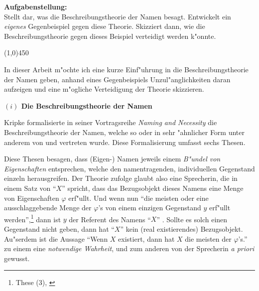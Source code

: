 \documentclass[a4paper, emulatestandardclasses, 12pt]{scrartcl}
\begin{document}
\begin{onehalfspace} 

\noindent\textbf{Aufgabenstellung:}\\
Stellt dar, was die Beschreibungstheorie der Namen besagt. Entwickelt ein \emph{eigenes} Gegenbeispiel gegen diese Theorie. Skizziert dann, wie die Beschreibungstheorie gegen dieses Beispiel verteidigt werden k"onnte.
\begin{center}
\vspace{-9pt}\line(1,0){450}
\end{center}

\vspace{0mm}
\noindent In dieser Arbeit m"ochte ich eine kurze Einf"uhrung in die Beschreibungstheorie der Namen geben, anhand eines Gegenbeispiels Unzul"anglichkeiten daran aufzeigen und eine m"ogliche Verteidigung der Theorie skizzieren.  

\vspace{3mm}

\noindent\textbf{$(i)$ Die Beschreibungstheorie der Namen}

\noindent Kripke formalisierte in seiner Vortragsreihe \emph{Naming and Necessity} \citep{kripke1972naming}  die Beschreibungstheorie der Namen, welche so oder in sehr "ahnlicher Form unter anderem von \citet{begriffundgegenstand} und \citet{russell1905denoting} vertreten wurde. Diese Formalisierung umfasst sechs Thesen.

Diese Thesen besagen, dass (Eigen-) Namen jeweils einem \emph{B"undel von Eigenschaften} entsprechen, welche den namentragenden, individuellen Gegenstand einzeln herausgreifen. Der Theorie zufolge glaubt also eine Sprecherin, die in einem Satz von "`$X$"' spricht, dass das Bezugsobjekt dieses Namens eine Menge von Eigenschaften $\varphi$ erf"ullt. Und wenn nun  "`die meisten oder eine ausschlaggebende Menge der $\varphi$'s von einem einzigen Gegenstand $y$ erf"ullt werden"',\footnote{These (3), \cite{kripke1972naming}} dann ist $y$ der Referent des Namens "`$X$"' . Sollte es solch einen Gegenstand nicht geben, dann hat "`$X$"' kein (real existierendes) Bezugsobjekt. Au"serdem ist die Aussage "`Wenn $X$ existiert, dann hat $X$ die meisten der $\varphi$'s."' zu einem eine \emph{notwendige Wahrheit}, und zum anderen von der Sprecherin \emph{a priori} gewusst.


\end{onehalfspace}
\end{document}
